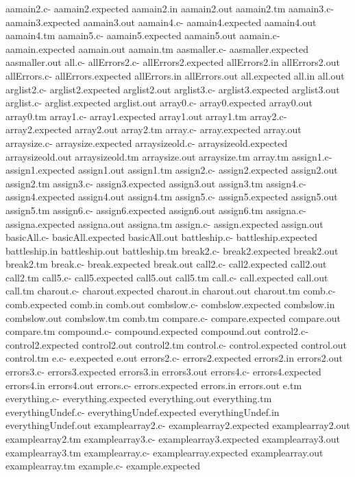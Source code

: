 \documentclass[12pt]{book}
\begin{document}
aamain2.c-
aamain2.expected
aamain2.in
aamain2.out
aamain2.tm
aamain3.c-
aamain3.expected
aamain3.out
aamain4.c-
aamain4.expected
aamain4.out
aamain4.tm
aamain5.c-
aamain5.expected
aamain5.out
aamain.c-
aamain.expected
aamain.out
aamain.tm
aasmaller.c-
aasmaller.expected
aasmaller.out
all.c-
allErrors2.c-
allErrors2.expected
allErrors2.in
allErrors2.out
allErrors.c-
allErrors.expected
allErrors.in
allErrors.out
all.expected
all.in
all.out
arglist2.c-
arglist2.expected
arglist2.out
arglist3.c-
arglist3.expected
arglist3.out
arglist.c-
arglist.expected
arglist.out
array0.c-
array0.expected
array0.out
array0.tm
array1.c-
array1.expected
array1.out
array1.tm
array2.c-
array2.expected
array2.out
array2.tm
array.c-
array.expected
array.out
arraysize.c-
arraysize.expected
arraysizeold.c-
arraysizeold.expected
arraysizeold.out
arraysizeold.tm
arraysize.out
arraysize.tm
array.tm
assign1.c-
assign1.expected
assign1.out
assign1.tm
assign2.c-
assign2.expected
assign2.out
assign2.tm
assign3.c-
assign3.expected
assign3.out
assign3.tm
assign4.c-
assign4.expected
assign4.out
assign4.tm
assign5.c-
assign5.expected
assign5.out
assign5.tm
assign6.c-
assign6.expected
assign6.out
assign6.tm
assigna.c-
assigna.expected
assigna.out
assigna.tm
assign.c-
assign.expected
assign.out
basicAll.c-
basicAll.expected
basicAll.out
battleship.c-
battleship.expected
battleship.in
battleship.out
battleship.tm
break2.c-
break2.expected
break2.out
break2.tm
break.c-
break.expected
break.out
call2.c-
call2.expected
call2.out
call2.tm
call5.c-
call5.expected
call5.out
call5.tm
call.c-
call.expected
call.out
call.tm
charout.c-
charout.expected
charout.in
charout.out
charout.tm
comb.c-
comb.expected
comb.in
comb.out
combslow.c-
combslow.expected
combslow.in
combslow.out
combslow.tm
comb.tm
compare.c-
compare.expected
compare.out
compare.tm
compound.c-
compound.expected
compound.out
control2.c-
control2.expected
control2.out
control2.tm
control.c-
control.expected
control.out
control.tm
e.c-
e.expected
e.out
errors2.c-
errors2.expected
errors2.in
errors2.out
errors3.c-
errors3.expected
errors3.in
errors3.out
errors4.c-
errors4.expected
errors4.in
errors4.out
errors.c-
errors.expected
errors.in
errors.out
e.tm
everything.c-
everything.expected
everything.out
everything.tm
everythingUndef.c-
everythingUndef.expected
everythingUndef.in
everythingUndef.out
examplearray2.c-
examplearray2.expected
examplearray2.out
examplearray2.tm
examplearray3.c-
examplearray3.expected
examplearray3.out
examplearray3.tm
examplearray.c-
examplearray.expected
examplearray.out
examplearray.tm
example.c-
example.expected
\end{document}
